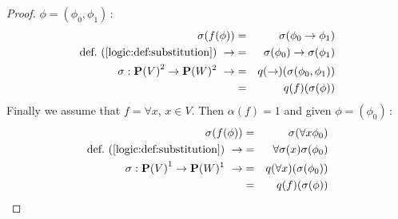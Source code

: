 \begin{proof}
$\phi=(\phi_{0},\phi_{1})$\,:
    \begin{eqnarray*}
    \sigma(f(\phi))&=&\sigma(\phi_{0}\to\phi_{1})\\
    \mbox{def.~(\ref{logic:def:substitution})}\ \rightarrow
    &=&\sigma(\phi_{0})\to\sigma(\phi_{1})\\
    \sigma:\mbox{${\bf P}(V)$}^{2}\to{\bf P}(W)^{2}\ \rightarrow
    &=&q(\to)(\sigma(\phi_{0},\phi_{1}))\\
    &=&q(f)(\sigma(\phi))
    \end{eqnarray*}
Finally we assume that $f=\forall x$, $x\in V$. Then $\alpha(f)=1$
and given $\phi=(\phi_{0})$\,:
    \begin{eqnarray*}
    \sigma(f(\phi))&=&\sigma(\forall x\phi_{0})\\
    \mbox{def.~(\ref{logic:def:substitution})}\ \rightarrow
    &=&\forall\sigma(x)\sigma(\phi_{0})\\
    \sigma:\mbox{${\bf P}(V)$}^{1}\to{\bf P}(W)^{1}\ \rightarrow
    &=&q(\forall x)(\sigma(\phi_{0}))\\
    &=&q(f)(\sigma(\phi))
    \end{eqnarray*}
\end{proof}
